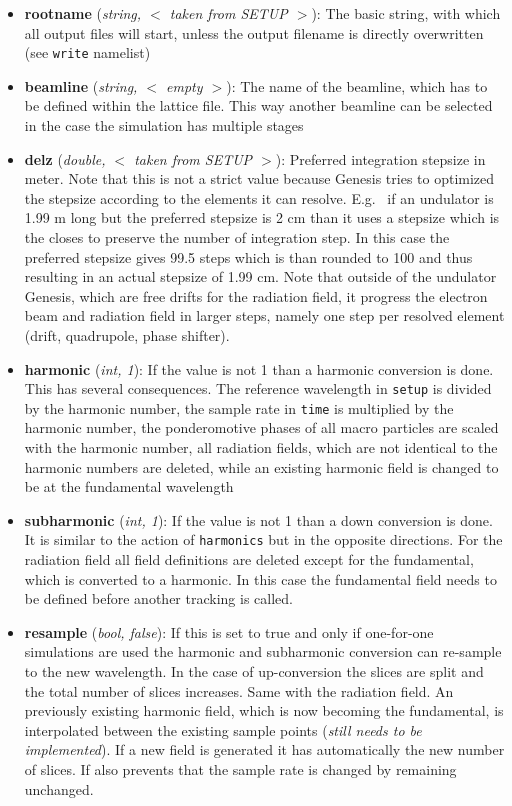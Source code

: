 \documentclass[12pt]{book}
\begin{document}
\begin{itemize}

\item {\bf rootname} ({\it string, $<$ taken from SETUP $>$}): The basic string, with which all output files will start, unless the output filename is directly overwritten (see {\tt write} namelist)
\item{\bf beamline} ({\it string, $<$ empty $>$}): The name of the beamline, which has to be defined within the lattice file. This way another beamline can be selected in the case the simulation has multiple stages
\item {\bf delz} ({\it double, $<$ taken from SETUP $>$}): Preferred integration stepsize in meter. Note that this is not a strict value because Genesis tries to optimized the stepsize according to the elements it can resolve. E.g.~ if an undulator is 1.99 m long but the preferred stepsize is 2 cm than it uses a stepsize which is the closes to preserve the number of integration step. In this case the preferred stepsize gives 99.5 steps which is than rounded to 100 and thus resulting in an actual stepsize of 1.99 cm.  Note that outside of the undulator Genesis, which are free drifts for the radiation field, it progress the electron beam and radiation field in larger steps, namely one step per resolved element (drift, quadrupole, phase shifter).
\item {\bf harmonic} ({\it int, 1}): If the value is not 1 than a harmonic conversion is done. This has several consequences. The reference wavelength in {\tt setup} is divided by the harmonic number, the sample rate in  {\tt time} is multiplied by the harmonic number, the ponderomotive phases of all macro particles are scaled with the harmonic number, all radiation fields, which are not identical to the harmonic numbers are deleted, while an existing harmonic field is changed to be at the fundamental wavelength

\item {\bf subharmonic} ({\it int, 1}): If the value is not 1 than a down conversion is done. It is similar to the action of {\tt harmonics} but in the opposite directions. For the radiation field all field definitions are deleted except for the fundamental, which is converted to a harmonic. In this case the fundamental field needs to be defined before another tracking is called.

\item {\bf resample} ({\it bool, false}): If this is set to true and only if one-for-one simulations are used the harmonic and subharmonic conversion can re-sample to the new wavelength. In the case of up-conversion the slices are split and the total number of slices increases. Same with the radiation field. An previously existing harmonic field, which is now becoming the fundamental, is interpolated between the existing sample points ({\it still needs to be implemented}). If a new field is generated it has automatically the new number of slices. If also prevents that the sample rate is changed by remaining unchanged.

\end{itemize}
\end{document}
